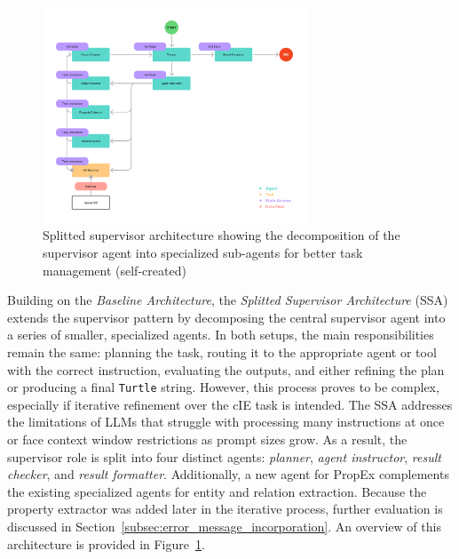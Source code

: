 \documentclass[a4paper,oneside,bibliography=totoc]{scrbook}
\begin{document}
\begin{figure}[tp]
  \centering
  \includegraphics[width=0.7\textwidth]{figures/Splitted Supervisor Architecture.png}
  \caption[Splitted supervisor architecture showing the decomposition of the supervisor agent into specialized sub-agents for better task management]{Splitted supervisor architecture showing the decomposition of the supervisor agent into specialized sub-agents for better task management (self-created)}
  \label{fig:splitted_supervisor_architecture}
\end{figure}

Building on the \textit{Baseline Architecture}, the \textit{Splitted Supervisor Architecture} (\ac{SSA}) extends the supervisor pattern by decomposing the central supervisor agent into a series of smaller, specialized agents. In both setups, the main responsibilities remain the same: planning the task, routing it to the appropriate agent or tool with the correct instruction, evaluating the outputs, and either refining the plan or producing a final \texttt{Turtle} string. However, this process proves to be complex, especially if iterative refinement over the \ac{cIE} task is intended. The \ac{SSA} addresses the limitations of \acp{LLM} that struggle with processing many instructions at once or face context window restrictions as prompt sizes grow. As a result, the supervisor role is split into four distinct agents: \textit{planner}, \textit{agent instructor}, \textit{result checker}, and \textit{result formatter}. Additionally, a new agent for \ac{PropEx} complements the existing specialized agents for entity and relation extraction. Because the property extractor was added later in the iterative process, further evaluation is discussed in Section~\ref{subsec:error_message_incorporation}. An overview of this architecture is provided in Figure~\ref{fig:splitted_supervisor_architecture}.
\end{document}
